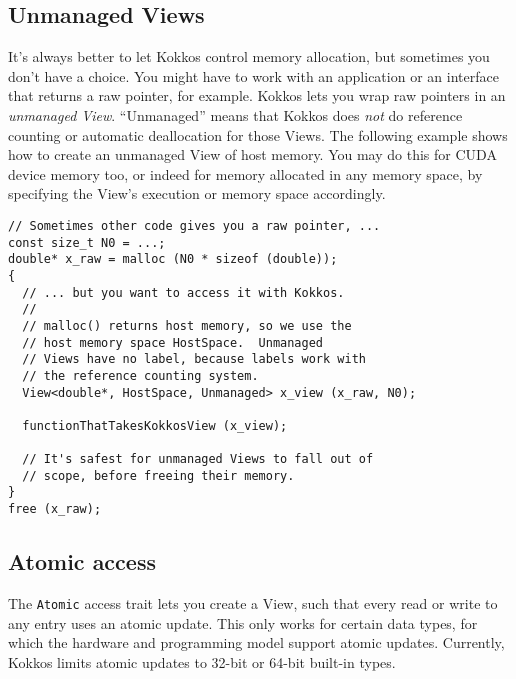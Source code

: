 \subsection{Unmanaged Views}

It's always better to let Kokkos control memory allocation, but
sometimes you don't have a choice.  You might have to work with an
application or an interface that returns a raw pointer, for example.
Kokkos lets you wrap raw pointers in an \emph{unmanaged View}.
``Unmanaged'' means that Kokkos does \emph{not} do reference counting
or automatic deallocation for those Views.  The following example
shows how to create an unmanaged View of host memory.  You may do this
for CUDA device memory too, or indeed for memory allocated in any
memory space, by specifying the View's execution or memory space
accordingly.
\begin{lstlisting}
// Sometimes other code gives you a raw pointer, ...
const size_t N0 = ...;
double* x_raw = malloc (N0 * sizeof (double));
{
  // ... but you want to access it with Kokkos.
  //
  // malloc() returns host memory, so we use the 
  // host memory space HostSpace.  Unmanaged
  // Views have no label, because labels work with
  // the reference counting system.
  View<double*, HostSpace, Unmanaged> x_view (x_raw, N0);

  functionThatTakesKokkosView (x_view);

  // It's safest for unmanaged Views to fall out of
  // scope, before freeing their memory.
}
free (x_raw);
\end{lstlisting}

\subsection{Atomic access}

The \lstinline!Atomic! access trait lets you create a View, such that every
read or write to any entry uses an atomic update.  This only works for
certain data types, for which the hardware and programming model
support atomic updates.  Currently, Kokkos limits atomic updates to
32-bit or 64-bit built-in types.

